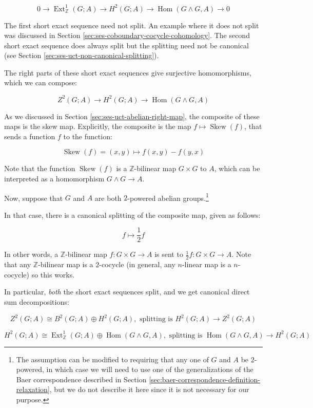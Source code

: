 \documentclass[10pt]{amsart}
\begin{document}
$$0 \to \operatorname{Ext}^1_{\mathbb{Z}}(G;A) \to H^2(G;A) \to \operatorname{Hom}(G \wedge G,A) \to 0$$

The first short exact sequence need not split. An example where it
does not split was discussed in Section
\ref{sec:ses-coboundary-cocycle-cohomology}. The second short exact
sequence does always split but the splitting need not be canonical (see
Section \ref{sec:ses-uct-non-canonical-splitting}).

The right parts of these short exact sequences give surjective
homomorphisms, which we can compose:

$$Z^2(G;A) \to H^2(G;A) \to \operatorname{Hom}(G \wedge G,A)$$

As we discussed in Section \ref{sec:ses-uct-abelian-right-map}, the
composite of these maps is the skew map. Explicitly, the composite is
the map $f \mapsto \operatorname{Skew}(f)$, that sends a function $f$
to the function:

$$\operatorname{Skew}(f) = (x,y) \mapsto f(x,y) - f(y,x)$$

Note that the function $\operatorname{Skew}(f)$ is a
$\mathbb{Z}$-bilinear map $G \times G$ to $A$, which can be
interpreted as a homomorphism $G \wedge G \to A$.

Now, suppose that $G$ and $A$ are both $2$-powered abelian
groups.\footnote{The assumption can be modified to requiring that any
  one of $G$ and $A$ be $2$-powered, in which case we will need to use
  one of the generalizations of the Baer correspondence described in
  Section \ref{sec:baer-correspondence-definition-relaxation}, but we
  do not describe it here since it is not necessary for our purpose.}

In that case, there is a canonical splitting of the composite map,
given as follows:

$$f \mapsto \frac{1}{2}f$$

In other words, a $\mathbb{Z}$-bilinear map $f: G \times G \to A$ is
sent to $\frac{1}{2}f:G \times G \to A$. Note that any
$\mathbb{Z}$-bilinear map is a $2$-cocycle (in general, any $n$-linear
map is a $n$-cocycle) so this works.

In particular, {\em both} the short exact sequences split, and we get
canonical direct sum decompositions:

$$Z^2(G;A) \cong B^2(G;A) \oplus H^2(G;A), \text{ splitting is } H^2(G;A) \to Z^2(G;A)$$

$$H^2(G;A) \cong \operatorname{Ext}^1_{\mathbb{Z}}(G;A) \oplus \operatorname{Hom}(G \wedge G,A), \text{ splitting is } \operatorname{Hom}(G \wedge G,A) \to H^2(G;A)$$
\end{document}

